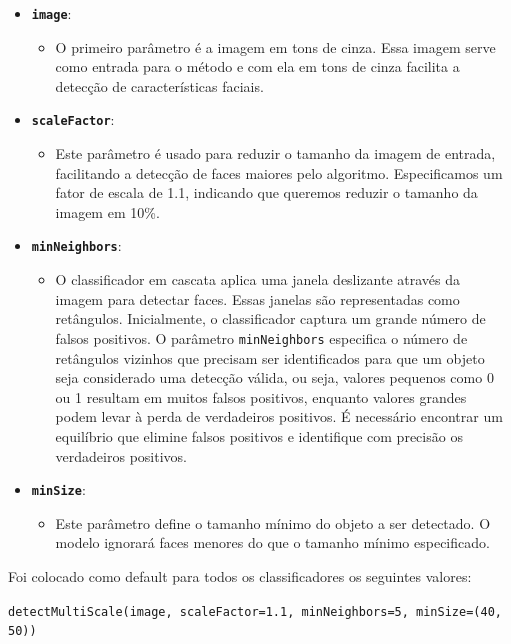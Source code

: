 \begin{itemize}
    \item \textbf{\texttt{image}}:
    \begin{itemize}
    \item O primeiro parâmetro é a imagem em tons de cinza. Essa imagem serve como entrada para o método e com ela em tons de cinza facilita a detecção de características faciais.
    \end{itemize}

\item \textbf{\texttt{scaleFactor}}:
\begin{itemize}
    \item Este parâmetro é usado para reduzir o tamanho da imagem de entrada, facilitando a detecção de faces maiores pelo algoritmo. Especificamos um fator de escala de 1.1, indicando que queremos reduzir o tamanho da imagem em 10\%.
    \end{itemize}

\item \textbf{\texttt{minNeighbors}}:
\begin{itemize}
    \item O classificador em cascata aplica uma janela deslizante através da imagem para detectar faces. Essas janelas são representadas como retângulos. Inicialmente, o classificador captura um grande número de falsos positivos. O parâmetro \texttt{minNeighbors} especifica o número de retângulos vizinhos que precisam ser identificados para que um objeto seja considerado uma detecção válida, ou seja, valores pequenos como 0 ou 1 resultam em muitos falsos positivos, enquanto valores grandes podem levar à perda de verdadeiros positivos. É necessário encontrar um equilíbrio que elimine falsos positivos e identifique com precisão os verdadeiros positivos.
\end{itemize}

\item \textbf{\texttt{minSize}}:
\begin{itemize}
    \item Este parâmetro define o tamanho mínimo do objeto a ser detectado. O modelo ignorará faces menores do que o tamanho mínimo especificado.
\end{itemize}

\end{itemize}

Foi colocado como default para todos os classificadores os seguintes valores: 

{\small \texttt{detectMultiScale(image, scaleFactor=1.1, minNeighbors=5, minSize=(40, 50))}}

